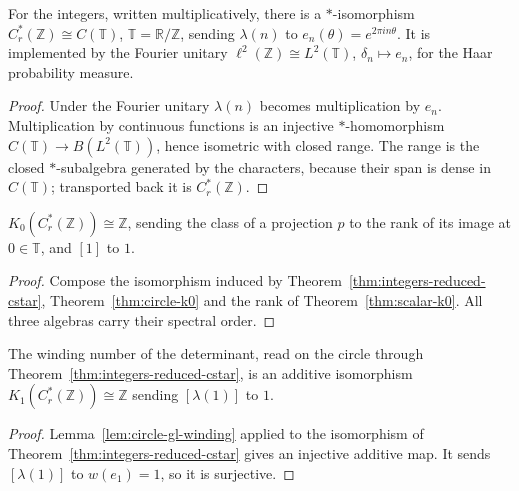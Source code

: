 \begin{theorem}\label{thm:integers-reduced-cstar}
\leanok
For the integers, written multiplicatively, there is a $*$-isomorphism
$C^*_r(\mathbb Z)\cong C(\mathbb T)$, $\mathbb T=\mathbb R/\mathbb Z$, sending
$\lambda(n)$ to $e_n(\theta)=e^{2\pi in\theta}$. It is
implemented by the Fourier unitary $\ell^2(\mathbb Z)\cong L^2(\mathbb T)$,
$\delta_n\mapsto e_n$, for the Haar probability measure.
\end{theorem}
\begin{proof}
\leanok
Under the Fourier unitary $\lambda(n)$ becomes multiplication by $e_n$.
Multiplication by continuous functions is an injective $*$-homomorphism
$C(\mathbb T)\to B(L^2(\mathbb T))$, hence isometric with closed range. The
range is the closed $*$-subalgebra generated by the characters, because their
span is dense in $C(\mathbb T)$; transported back it is $C^*_r(\mathbb Z)$.
\end{proof}

\begin{theorem}\label{thm:integers-reduced-k0}
\leanok
$K_0(C^*_r(\mathbb Z))\cong\mathbb Z$, sending the class of a projection $p$ to
the rank of its image at $0\in\mathbb T$, and $[1]$ to $1$.
\end{theorem}
\begin{proof}
\leanok
Compose the isomorphism induced by Theorem~\ref{thm:integers-reduced-cstar},
Theorem~\ref{thm:circle-k0} and the rank of Theorem~\ref{thm:scalar-k0}.
All three algebras carry their spectral order.
\end{proof}

\begin{theorem}\label{thm:integers-reduced-k1}
\leanok
The winding number of the determinant, read on the circle through
Theorem~\ref{thm:integers-reduced-cstar}, is an additive isomorphism
$K_1(C^*_r(\mathbb Z))\cong\mathbb Z$ sending $[\lambda(1)]$ to $1$.
\end{theorem}
\begin{proof}
\leanok
Lemma~\ref{lem:circle-gl-winding} applied to the isomorphism of
Theorem~\ref{thm:integers-reduced-cstar} gives an injective additive map.
It sends $[\lambda(1)]$ to $w(e_1)=1$, so it is surjective.
\end{proof}


